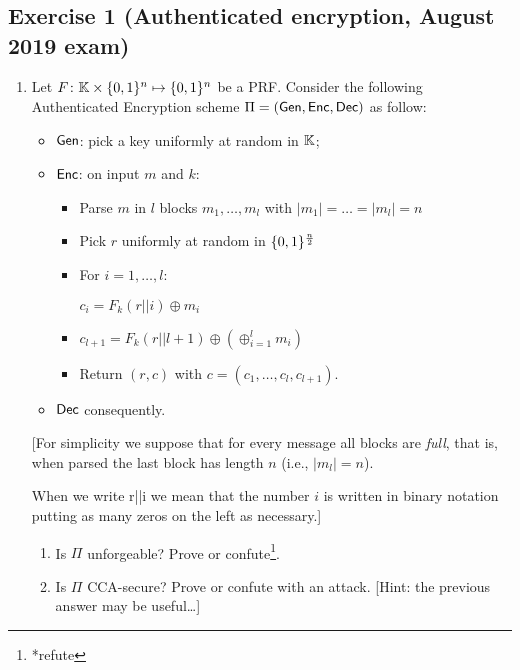 \section{}
\subsection{Exercise 1 (Authenticated encryption, August 2019 exam)}

\begin{enumerate}
	\item Let $F\colon \mathbb{K} \times \{0, 1\}^n \mapsto \{0, 1\}^n$ be a PRF. Consider the following Authenticated Encryption scheme $\Pi=(\operatorname{\mathsf{Gen}}, \operatorname{\mathsf{Enc}}, \operatorname{\mathsf{Dec}})$ as follow:
	\begin{itemize}
		\item $\operatorname{\mathsf{Gen}}$: pick a key uniformly at random in $\mathbb{K}$;
		\item $\operatorname{\mathsf{Enc}}$: on input $m$ and $k$:
		\begin{itemize}
			\item Parse $m$ in $l$ blocks $m_1,\dots,m_l$ with $|m_1|=\dots=|m_l|=n$
			\item Pick $r$ uniformly at random in $\{0, 1\}^{\frac{n}{2}}$
			\item For $i=1,\dots,l$:

				\hspace{1cm} $c_i=F_k(r||i) \oplus m_i$
			\item $c_{l+1}=F_k(r||l+1) \oplus \left(\oplus_{i=1}^l m_i\right)$
			\item Return $(r, c)$ with $c=(c_1,\dots,c_l,c_{l+1})$.
		\end{itemize}
		\item $\operatorname{\mathsf{Dec}}$ consequently.
	\end{itemize}
	[For simplicity we suppose that for every message all blocks are \emph{full}, that is, when parsed the last block has length $n$ (i.e., $|m_l|=n$).

	When we write r||i we mean that the number $i$ is written in binary notation putting as many zeros on the left as necessary.]

	\begin{enumerate}
		\item Is $\Pi$ unforgeable? Prove or confute\footnote{*refute}.
		\item Is $\Pi$ CCA-secure? Prove or confute with an attack. [Hint: the previous answer may be useful\dots]
	\end{enumerate}


\end{enumerate}
